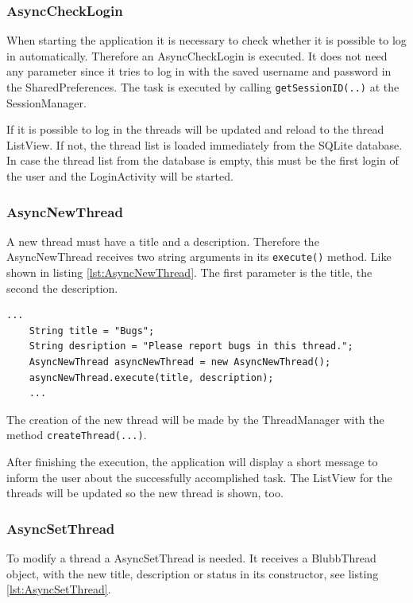 \documentclass[12pt,a4paper,oneside]{report}
\newcommand{\code}[1]{\lstinline{#1}}
\begin{document}
\subsubsection{AsyncCheckLogin}
\label{AsyncCheckLogin}
When starting the application it is necessary to check whether it is possible to log in automatically.
Therefore an AsyncCheckLogin is executed. It does not need any parameter since it tries to log in with the saved username and password in the SharedPreferences. 
The task is executed by calling \code{getSessionID(..)} at the SessionManager.


If it is possible to log in the threads will be updated and reload to the thread ListView. If not, the thread list is loaded immediately from the SQLite database. In case the thread list from the database is empty, this must be the first login of the user and the LoginActivity will be started.

\subsubsection{AsyncNewThread}
\label{subsubsec:AsyncNewThread}
A new thread must have a title and a description. Therefore the AsyncNewThread receives two string arguments in its \code{execute()} method. Like shown in listing \ref{lst:AsyncNewThread}. The first parameter is the title, the second the description. 
\lstset{language=java}
\begin{lstlisting}[caption=AsyncNewThread example, label=lst:AsyncNewThread]
	...
	String title = "Bugs";
	String desription = "Please report bugs in this thread.";
	AsyncNewThread asyncNewThread = new AsyncNewThread();
	asyncNewThread.execute(title, description);
	...
\end{lstlisting}
The creation of the new thread will be made by the ThreadManager with the method \code{createThread(...)}.

After finishing the execution, the application will display a short message to inform the user about the successfully accomplished task. The ListView for the threads will be updated so the new thread is shown, too.

\subsubsection{AsyncSetThread}
\label{subsubsec:AsyncSetThread}
To modify a thread a AsyncSetThread is needed. It receives a BlubbThread object, with the new title, description or status in its constructor, see listing \ref{lst:AsyncSetThread}.
\end{document}
